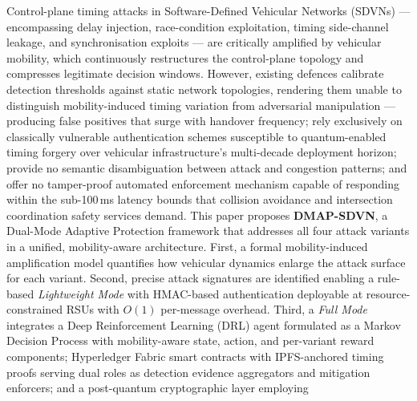 Control-plane timing attacks in Software-Defined Vehicular Networks
(SDVNs) — encompassing delay injection, race-condition exploitation,
timing side-channel leakage, and synchronisation exploits — are
critically amplified by vehicular mobility, which continuously
restructures the control-plane topology and compresses legitimate
decision windows. However, existing defences  calibrate detection thresholds against static network topologies, rendering them unable to distinguish 
mobility-induced timing variation from adversarial manipulation — producing false positives that surge with handover frequency; rely exclusively on classically vulnerable authentication schemes susceptible to quantum-enabled timing forgery over vehicular infrastructure's multi-decade deployment horizon; 
provide no semantic disambiguation between attack and congestion patterns; and offer no tamper-proof automated enforcement mechanism capable of responding within the sub-100\,ms latency bounds that collision avoidance and intersection coordination safety services demand. This paper proposes \textbf{DMAP-SDVN}, a Dual-Mode Adaptive Protection framework that addresses all four attack
variants in a unified, mobility-aware architecture. First, a formal
mobility-induced amplification model quantifies how vehicular
dynamics enlarge the attack surface for each variant. Second,
precise attack signatures are identified enabling a rule-based
\emph{Lightweight Mode} with HMAC-based authentication deployable
at resource-constrained RSUs with $O(1)$ per-message overhead.
Third, a \emph{Full Mode} integrates a Deep Reinforcement Learning
(DRL) agent formulated as a Markov Decision Process with
mobility-aware state, action, and per-variant reward components;
Hyperledger Fabric smart contracts with IPFS-anchored timing proofs
serving dual roles as detection evidence aggregators and mitigation
enforcers; and a post-quantum cryptographic layer employing
